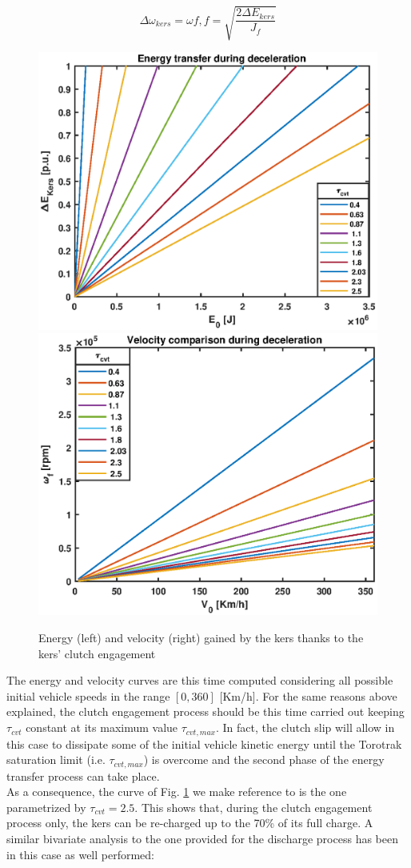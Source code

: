 \documentclass[11pt]{article}
\begin{document}
\begin{equation}
\Delta \omega_{kers} = \omega f,f = \sqrt{\frac{2\Delta E_{kers}}{J_f}}
\end{equation}

\begin{figure}[H]
\captionsetup{font=small, justification=centering}
\centering
\includegraphics[width=.49\textwidth]{Images/Results_new/Univariate_SteadyState/en_comp_dec.eps}\hfill
\includegraphics[width=.49\textwidth]{Images/Results_new/Univariate_SteadyState/vel_comp_dec.eps}
\caption{Energy (left) and velocity (right) gained by the kers thanks to the kers' clutch engagement}
\label{en_comp_dec}
\end{figure}

The energy and velocity curves are this time computed considering all possible initial vehicle speeds in the range $[0, 360]$ [Km/h]. For the same reasons above explained, the clutch engagement process should be this time carried out keeping $\tau_{cvt}$ constant at its maximum value $\tau_{cvt,max}$. In fact, the clutch slip will allow in this case to dissipate some of the initial vehicle kinetic energy until the Torotrak saturation limit (i.e. $\tau_{cvt,max}$) is overcome and the second phase of the energy transfer process can take place.\\As a consequence, the curve of Fig. \ref{en_comp_dec} we make reference to is the one parametrized by $\tau_{cvt}=2.5$. This shows that, during the clutch engagement process only, the kers can be re-charged up to the 70\% of its full charge.   
A similar bivariate analysis to the one provided for the discharge process has been in this case as well performed:
\end{document}
